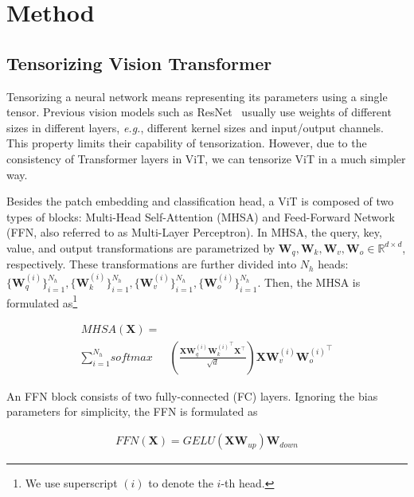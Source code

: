 \section{Method}

\subsection{Tensorizing Vision Transformer} Tensorizing a neural network means representing its parameters using a single tensor. Previous vision models such as ResNet~\cite{resnet} usually use weights of different sizes in different layers, \emph{e.g.}, different kernel sizes and input/output channels. This property limits their capability of tensorization. However, due to the consistency of Transformer layers in ViT, we can tensorize ViT in a much simpler way. 

Besides the patch embedding and classification head, a ViT is composed of two types of blocks: Multi-Head Self-Attention (MHSA) and Feed-Forward Network (FFN, also referred to as Multi-Layer Perceptron). In MHSA, the query, key, value, and output transformations are parametrized by $\boldsymbol{W}_q, \boldsymbol{W}_k, \boldsymbol{W}_v, \boldsymbol{W}_o \in \mathbb{R}^{d\times d}$, respectively. These transformations are further divided into $N_h$ heads: $\{\boldsymbol{W}_q^{(i)}\}^{N_h}_{i=1}, \{\boldsymbol{W}_k^{(i)}\}^{N_h}_{i=1}, \{\boldsymbol{W}_v^{(i)}\}^{N_h}_{i=1}, \{\boldsymbol{W}_o^{(i)}\}^{N_h}_{i=1}$. Then, the MHSA is formulated as\footnote{We use superscript $(i)$ to denote the $i$-th head.}

\begin{equation}
\begin{aligned}
    \textit{MHSA}(\boldsymbol{X})=&\\\sum_{i=1}^{N_h}\textit{softmax}&\left(\frac{\boldsymbol{X}\boldsymbol{W}_q^{(i)}{\boldsymbol{W}_k^{(i)}}^\intercal\boldsymbol{X}^\intercal}{\sqrt{d}}\right)\boldsymbol{X}\boldsymbol{W}_v^{(i)}{\boldsymbol{W}_o^{(i)}}^\intercal
\end{aligned}    
\end{equation}

An FFN block consists of two fully-connected (FC) layers. Ignoring the bias parameters for simplicity, the FFN is formulated as

\begin{equation}
\begin{aligned}
    \textit{FFN}(\boldsymbol{X})=\textit{GELU}(\boldsymbol{X}\boldsymbol{W}_{up})\boldsymbol{W}_{down}
\end{aligned}    
\end{equation}

